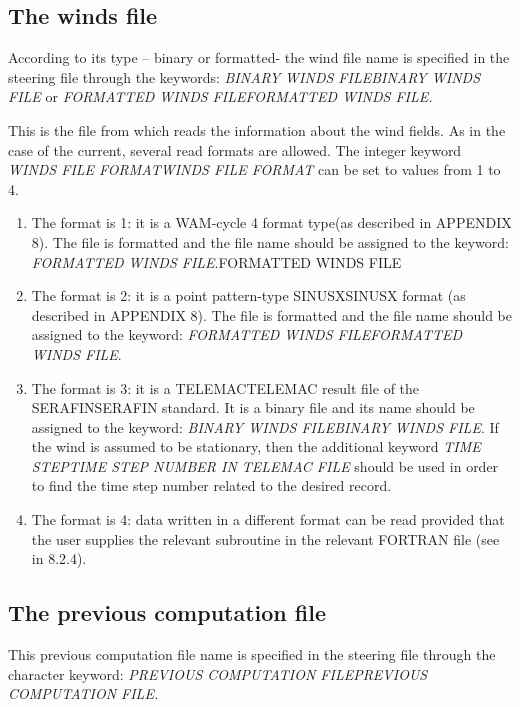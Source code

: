 \subsection{ The winds file}

 According to its type -- binary or formatted- the wind file name is specified in the steering file through the keywords: \textit{BINARY WINDS FILEBINARY WINDS FILE }or\textit{ FORMATTED WINDS FILEFORMATTED WINDS FILE.}

 This is the file from which \tomawac reads the information about the wind fields. As in the case of the current, several read formats are allowed. The integer keyword \textit{WINDS FILE FORMATWINDS FILE FORMAT} can\textit{ }be set to values from 1 to 4.

\begin{enumerate}
\item  The format is 1: it is a WAM-cycle 4 format type(as described in APPENDIX 8). The file is formatted and the file name should be assigned to the keyword: \textit{FORMATTED WINDS FILE}.FORMATTED WINDS FILE

\item  The format is 2: it is a point pattern-type SINUSXSINUSX format (as described in APPENDIX 8). The file is formatted and the file name should be assigned to the keyword: \textit{FORMATTED WINDS FILEFORMATTED WINDS FILE}.

\item  The format is 3: it is a TELEMACTELEMAC result file of the SERAFINSERAFIN standard. It is a binary file and its name should be assigned to the keyword: \textit{BINARY WINDS FILEBINARY WINDS FILE}. If the wind is assumed to be stationary, then the additional keyword \textit{TIME STEPTIME STEP NUMBER IN TELEMAC FILE }should be used in order to find the time step number related to the desired record.

\item  The format is 4: data written in a different format can be read provided that the user supplies the relevant subroutine in the relevant FORTRAN file (see in 8.2.4).
\end{enumerate}


\subsection{ The previous computation file}

 This previous computation file name is specified in the steering file through the character keyword: \textit{PREVIOUS COMPUTATION FILEPREVIOUS COMPUTATION FILE.}

